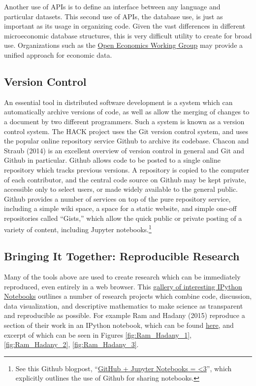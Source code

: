 \documentclass[]{article}
\begin{document}
Another use of APIs is to define an interface between any language and
particular datasets. This second use of APIs, the database use, is just
as important as its usage in organizing code. Given the vast differences
in different microeconomic database structures, this is very difficult
utility to create for broad use. Organizations such as the
\href{http://openeconomics.net/}{Open Economics Working Group} may
provide a unified approach for economic data.

\subsection{Version Control}\label{version-control}

An essential tool in distributed software development is a system which
can automatically archive versions of code, as well as allow the merging
of changes to a document by two different programmers. Such a system is
known as a version control system. The HACK project uses the Git version
control system, and uses the popular online repository service Github to
archive its codebase. Chacon and Straub (2014) is an excellent overview
of version control in general and Git and Github in particular. Github
allows code to be posted to a single online repository which tracks
previous versions. A repository is copied to the computer of each
contributor, and the central code source on Github may be kept private,
accessible only to select users, or made widely available to the general
public. Github provides a number of services on top of the pure
repository service, including a simple wiki space, a space for a static
website, and simple one-off repositories called ``Gists,'' which allow
the quick public or private posting of a variety of content, including
Jupyter notebooks.\footnote{See this Github blogpost,
  ``\href{https://github.com/blog/1995-github-jupyter-notebooks-3}{GitHub
  + Jupyter Notebooks = \textless{}3}'', which explicitly outlines the
  use of Github for sharing notebooks.}

\subsection{Bringing It Together: Reproducible
Research}\label{bringing-it-together-reproducible-research}

Many of the tools above are used to create research which can be
immediately reproduced, even entirely in a web browser. This
\href{https://github.com/ipython/ipython/wiki/A-gallery-of-interesting-IPython-Notebooks}{gallery
of interesting IPython Notebooks} outlines a number of research projects
which combine code, discussion, data visualization, and descriptive
mathematics to make science as transparent and reproducible as possible.
For example Ram and Hadany (2015) reproduce a section of their work in
an IPython notebook, which can be found
\href{http://nbviewer.ipython.org/url/www.sciencedirect.com/science/MiamiMultiMediaURL/1-s2.0-S0040580914000811/1-s2.0-S0040580914000811-mmc1.txt/272364/FULL/S0040580914000811/471cf02085a52c248dc76ae65ad4409d/mmc1.txt}{here},
and excerpt of which can be seen in Figures \ref{fig:Ram_Hadany_1},
\ref{fig:Ram_Hadany_2}, \ref{fig:Ram_Hadany_3}.
\end{document}
